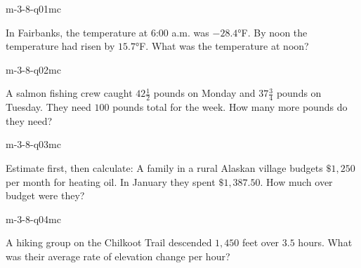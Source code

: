 

\begin{practiceQuestion}{m-3-8-q01}{mc}
\begin{questionText}
In Fairbanks, the temperature at $6$:$00$ a.m. was $-28.4°$F. By noon the temperature had risen by $15.7°$F. What was the temperature at noon?
\end{questionText}
\end{practiceQuestion}

\begin{practiceQuestion}{m-3-8-q02}{mc}
\begin{questionText}
A salmon fishing crew caught $42\frac{1}{2}$ pounds on Monday and $37\frac{3}{4}$ pounds on Tuesday. They need $100$ pounds total for the week. How many more pounds do they need?
\end{questionText}
\end{practiceQuestion}

\begin{practiceQuestion}{m-3-8-q03}{mc}
\begin{questionText}
Estimate first, then calculate: A family in a rural Alaskan village budgets $\$1{,}250$ per month for heating oil. In January they spent $\$1{,}387.50$. How much over budget were they?
\end{questionText}
\end{practiceQuestion}

\begin{practiceQuestion}{m-3-8-q04}{mc}
\begin{questionText}
A hiking group on the Chilkoot Trail descended $1{,}450$ feet over $3.5$ hours. What was their average rate of elevation change per hour?
\end{questionText}
\end{practiceQuestion}

